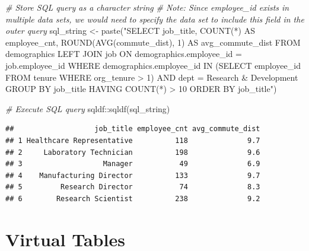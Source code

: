 \documentclass[
]{book}
\newenvironment{Shaded}{\begin{snugshade}}{\end{snugshade}}
\newcommand{\CommentTok}[1]{\textcolor[rgb]{0.56,0.35,0.01}{\textit{#1}}}
\newcommand{\FunctionTok}[1]{\textcolor[rgb]{0.00,0.00,0.00}{#1}}
\newcommand{\NormalTok}[1]{#1}
\newcommand{\OtherTok}[1]{\textcolor[rgb]{0.56,0.35,0.01}{#1}}
\newcommand{\SpecialCharTok}[1]{\textcolor[rgb]{0.00,0.00,0.00}{#1}}
\newcommand{\StringTok}[1]{\textcolor[rgb]{0.31,0.60,0.02}{#1}}
\begin{document}
\begin{Shaded}
\begin{Highlighting}[]
\CommentTok{\# Store SQL query as a character string}
\CommentTok{\# Note: Since employee\_id exists in multiple data sets, we would need to specify the data set to include this field in the outer query}
\NormalTok{sql\_string }\OtherTok{\textless{}{-}} \FunctionTok{paste}\NormalTok{(}\StringTok{"SELECT}
\StringTok{                      job\_title,}
\StringTok{                      COUNT(*) AS employee\_cnt,}
\StringTok{                      ROUND(AVG(commute\_dist), 1) AS avg\_commute\_dist}
\StringTok{                    FROM}
\StringTok{                        demographics}
\StringTok{                      LEFT JOIN}
\StringTok{                        job}
\StringTok{                      ON}
\StringTok{                        demographics.employee\_id = job.employee\_id}
\StringTok{                    WHERE}
\StringTok{                        demographics.employee\_id IN (SELECT employee\_id FROM tenure WHERE org\_tenure \textgreater{} 1)}
\StringTok{                      AND }
\StringTok{                        dept = \textquotesingle{}Research \& Development\textquotesingle{}}
\StringTok{                    GROUP BY}
\StringTok{                      job\_title}
\StringTok{                    HAVING}
\StringTok{                      COUNT(*) \textgreater{} 10}
\StringTok{                    ORDER BY}
\StringTok{                      job\_title"}\NormalTok{)}

\CommentTok{\# Execute SQL query}
\NormalTok{sqldf}\SpecialCharTok{::}\FunctionTok{sqldf}\NormalTok{(sql\_string)}
\end{Highlighting}
\end{Shaded}

\begin{verbatim}
##                   job_title employee_cnt avg_commute_dist
## 1 Healthcare Representative          118              9.7
## 2     Laboratory Technician          198              9.6
## 3                   Manager           49              6.9
## 4    Manufacturing Director          133              9.7
## 5         Research Director           74              8.3
## 6        Research Scientist          238              9.2
\end{verbatim}

\hypertarget{virtual-tables}{%
\section{Virtual Tables}\label{virtual-tables}}
\end{document}
